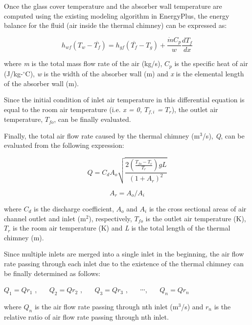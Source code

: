 Once the glass cover temperature and the absorber wall temperature are computed using the existing modeling algorithm in EnergyPlus, the energy balance for the fluid (air inside the thermal chimney) can be expressed as:

\begin{equation}
{h_{wf}}({T_w} - \overline {{T_f}} ) = {h_{gf}}(\overline {{T_f}}  - {T_g}) + \frac{{\dot m{C_p}}}{w}\frac{{d{T_f}}}{{dx}}
\end{equation}

where \emph{m} is the total mass flow rate of the air (kg/s), \(C_{p}\) is the specific heat of air (J/kg-\(^{\circ}\)C), \emph{w} is the width of the absorber wall (m) and \emph{x} is the elemental length of the absorber wall (m).

Since the initial condition of inlet air temperature in this differential equation is equal to the room air temperature (i.e. \emph{x = 0, \(T_{f,i}\) = \(T_{r}\)}), the outlet air temperature, \(T_{fo}\), can be finally evaluated.

Finally, the total air flow rate caused by the thermal chimney (m\(^{3}\)/s), \emph{Q}, can be evaluated from the following expression:

\begin{equation}
Q = {C_d}{A_o}\sqrt {\frac{{2(\frac{{{T_{fo}} - {T_r}}}{{{T_r}}})gL}}{{{{(1 + {A_r})}^2}}}}
\end{equation}

\begin{equation}
{A_r} = {A_o}/{A_i}
\end{equation}

where \(C_{d}\) is the discharge coefficient, \(A_{o}\) and \(A_{i}\) is the cross sectional areas of air channel outlet and inlet (m\(^{2}\)), respectively, \(T_{fo}\) is the outlet air temperature (K), \(T_{r}\) is the room air temperature (K) and \emph{L} is the total length of the thermal chimney (m).

Since multiple inlets are merged into a single inlet in the beginning, the air flow rate passing through each inlet due to the existence of the thermal chimney can be finally determined as follows:

\({Q_1} = Q{r_1}\) ,~~~ \({Q_2} = Q{r_2}\) ,~~~ \({Q_3} = Q{r_3}\) ,~~~ ∙∙∙,~~~ \({Q_n} = Q{r_n}\)

where \(Q_{n}\) is the air flow rate passing through nth inlet (m\(^{3}\)/s) and \(r_{n}\) is the relative ratio of air flow rate passing through nth inlet.

